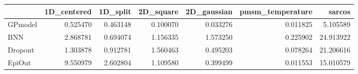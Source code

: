 \begin{tabular}{lrrrrrr}
\toprule
{} &  1D\_centered &  1D\_split &  2D\_square &  2D\_gaussian &  pmsm\_temperature &     sarcos \\
\midrule
GPmodel &     0.525470 &  0.463148 &   0.100070 &     0.033276 &          0.011825 &   5.105589 \\
BNN     &     2.868781 &  0.694074 &   1.156335 &     1.573250 &          0.225902 &  24.913922 \\
Dropout &     1.303878 &  0.912781 &   1.560463 &     0.495203 &          0.078264 &  21.206616 \\
EpiOut  &     9.550979 &  2.602804 &   1.109580 &     0.399499 &          0.011553 &  15.010579 \\
\bottomrule
\end{tabular}
